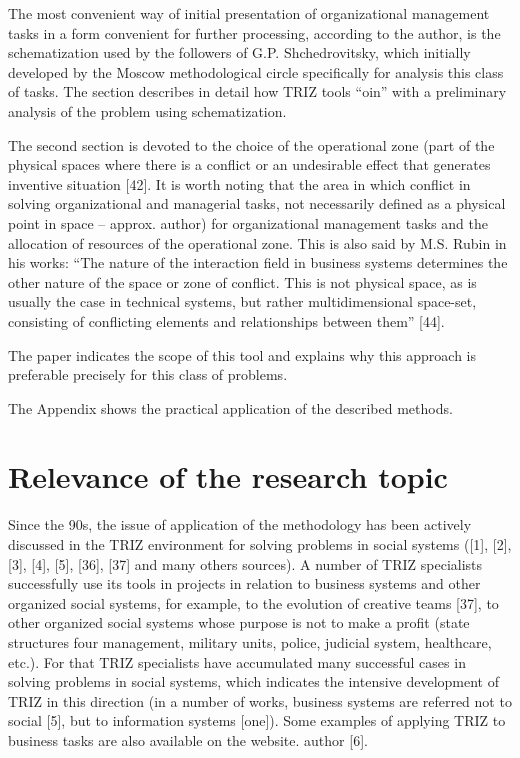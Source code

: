 \documentclass[11pt,a4paper]{book}
\begin{document}
The most convenient way of initial presentation of organizational management
tasks in a form convenient for further processing, according to the author, is
the schematization used by the followers of G.P. Shchedrovitsky, which
initially developed by the Moscow methodological circle specifically for
analysis this class of tasks. The section describes in detail how TRIZ tools
“oin” with a preliminary analysis of the problem using schematization.

The second section is devoted to the choice of the operational zone (part of
the physical spaces where there is a conflict or an undesirable effect that
generates inventive situation [42]. It is worth noting that the area in which
conflict in solving organizational and managerial tasks, not necessarily
defined as a physical point in space -- approx. author) for organizational
management tasks and the allocation of resources of the operational zone. This
is also said by M.S. Rubin in his works: “The nature of the interaction field
in business systems determines the other nature of the space or zone of
conflict. This is not physical space, as is usually the case in technical
systems, but rather multidimensional space-set, consisting of conflicting
elements and relationships between them” [44].

The paper indicates the scope of this tool and explains why this approach is
preferable precisely for this class of problems.

The Appendix shows the practical application of the described methods.

\section{Relevance of the research topic}

Since the 90s, the issue of application of the methodology has been actively
discussed in the TRIZ environment for solving problems in social systems ([1],
[2], [3], [4], [5], [36], [37] and many others sources). A number of TRIZ
specialists successfully use its tools in projects in relation to business
systems and other organized social systems, for example, to the evolution of
creative teams [37], to other organized social systems whose purpose is not to
make a profit (state structures four management, military units, police,
judicial system, healthcare, etc.). For that TRIZ specialists have accumulated
many successful cases in solving problems in social systems, which indicates
the intensive development of TRIZ in this direction (in a number of works,
business systems are referred not to social [5], but to information systems
[one]). Some examples of applying TRIZ to business tasks are also available on
the website.  author [6].
\end{document}
